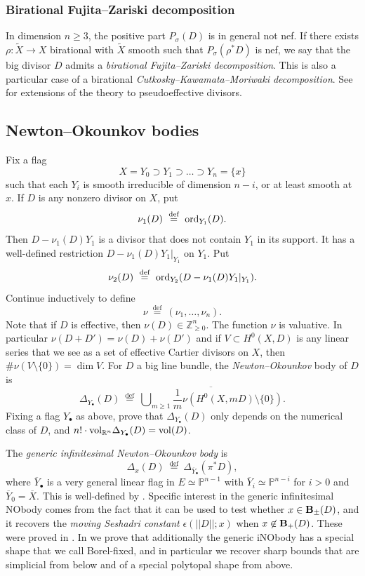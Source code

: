 \documentclass[12pt]{amsart}
\theoremstyle{definition}
\newcommand{\bb}{\ensuremath{\mathfrak{b}}}
\renewcommand{\geq}{\geqslant}
\DeclareMathOperator{\vol}{vol}
\newcommand{\deq}{\ensuremath{\stackrel{\textrm{def}}{=}}}
\newcommand{\nob}[2]{\ensuremath{\Delta_{#1}(#2)}}
\newcommand{\inob}[2]{\ensuremath{{\Delta}_{#1}(#2)}}
\newcommand{\?}{ \circled{{\large\bf ?}}}
\let\bb\mathbb
\begin{document}
\subsubsection{Birational Fujita--Zariski decomposition}
In dimension $n\geq 3$, the positive part $P_{\sigma}(D)$ is in general not nef. If there exists $\rho:\widetilde X\to X$ birational with $\widetilde X$ smooth such that $P_{\sigma}(\rho^*D)$ is nef, we say that the big divisor $D$ admits a \emph{birational Fujita--Zariski decomposition}. This is also a particular case of a birational \emph{Cutkosky--Kawamata--Moriwaki decomposition}. See \cite{Pro03,KM13} for extensions of the theory to pseudoeffective divisors.

\subsection{Newton--Okounkov bodies}\label{ss:NObodies}

Fix a flag 
\[X=Y_0\supset Y_1\supset\ldots\supset Y_n=\{x\}\] 
such that each $Y_i$ is smooth irreducible of dimension $n-i$, or at least smooth at $x$. If $D$ is any nonzero  divisor on $X$, put
\[\nu_1(D)\ \deq\ \textup{ord}_{Y_1}(D).\]
Then $D-\nu_1(D)Y_1$ is a divisor that does not contain $Y_1$ in its support. It has a well-defined restriction $D-\nu_1(D)Y_1|_{Y_1}$ on $Y_1$. Put
\[\nu_2(D)\ \deq\ \textup{ord}_{Y_2}(D-\nu_1(D)Y_1|_{Y_1}).\]
Continue inductively to define
\[\nu\ \deq\ (\nu_1,\ldots,\nu_n).\]
Note that if $D$ is effective, then $\nu(D)\in\bb Z^n_{\geq 0}$. The function $\nu$ is valuative. In particular
$\nu(D+D')=\nu(D)+\nu(D')$
and if $V\subset H^0(X,D)$ is any linear series that we see as a set of effective Cartier divisors on $X$, then
$\#\nu(V\setminus\{0\})=\dim V.$
For $D$ a big line bundle, the \emph{Newton--Okounkov} body of $D$ is 
\[\nob{Y_{\bullet}}{D}\ \deq\ \overline{\bigcup\nolimits_{m\geq 1}\frac 1m\nu(H^0(X,mD)\setminus\{0\})}.\]
Fixing a flag $Y_{\bullet}$ as above, \cite{LM09} prove that $\nob{Y_{\bullet}}{D}$ only depends on the numerical class of $D$, and $n!\cdot {\rm vol}_{\bb R^n}\nob{Y_{\bullet}}{D}=\vol(D)$.

The \emph{generic infinitesimal Newton--Okounkov body} is
\[\inob{x}{D}\ \deq\ \nob{\overline Y_{\bullet}}{\pi^*D},\]
where $\overline Y_{\bullet}$ is a very general linear flag in $E\simeq\bb P^{n-1}$ with $\overline Y_i\simeq\bb P^{n-i}$ for $i>0$ and $\overline Y_0=\overline X$. This is well-defined by \cite{LM09}.
Specific interest in the generic infinitesimal NObody comes from the fact that it can be used to test whether $x\in{\bf B}_{\pm}(D)$, and it recovers the \emph{moving Seshadri constant} $\epsilon(||D||;x)$ when $x\not\in{\bf B}_+(D)$. These were proved in \cite{KL17}. In \cite{FLgeneralities} we prove that additionally the generic iNObody has a special shape that we call Borel-fixed, and in particular we recover sharp bounds that are simplicial from below and of a special polytopal shape from above.
\end{document}
